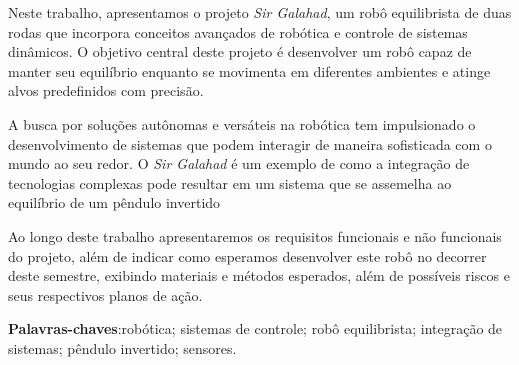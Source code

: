 
\begin{resumo}%

    
    Neste trabalho, apresentamos o projeto \textit{Sir Galahad}, um robô equilibrista de duas rodas que incorpora conceitos avançados de robótica e controle de sistemas dinâmicos. O objetivo central deste projeto é desenvolver um robô capaz de manter seu equilíbrio enquanto se movimenta em diferentes ambientes e atinge alvos predefinidos com precisão.

A busca por soluções autônomas e versáteis na robótica tem impulsionado o desenvolvimento de sistemas que podem interagir de maneira sofisticada com o mundo ao seu redor. O \textit{Sir Galahad} é um exemplo de como a integração de tecnologias complexas pode resultar em um sistema que se assemelha ao equilíbrio de um pêndulo invertido

Ao longo deste trabalho apresentaremos os requisitos funcionais e não funcionais do projeto, além de indicar como esperamos desenvolver este robô no decorrer deste semestre, exibindo materiais e métodos esperados, além de possíveis riscos e seus respectivos planos de ação. 


    \noindent
    \textbf{Palavras-chaves}:robótica; sistemas de controle; robô equilibrista; integração de sistemas; pêndulo invertido; sensores.

\end{resumo}
    